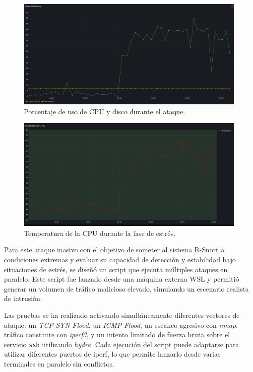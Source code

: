 \documentclass[11pt,a4paper,twoside]{report}
\begin{document}
\begin{figure}[H]
	\centering
	\includegraphics[width=\textwidth]{benchmark/5.png}
	\caption{Porcentaje de uso de CPU y disco durante el ataque.}
	\label{fig:bench-uso-cpu-disco}
\end{figure}

\begin{figure}[H]
	\centering
	\includegraphics[width=\textwidth]{benchmark/4.png}
	\caption{Temperatura de la CPU durante la fase de estrés.}
	\label{fig:bench-temp-cpu}
\end{figure}

Para este ataque masivo con el objetivo de someter al sistema R-Snort a condiciones extremas y evaluar su capacidad de detección y estabilidad bajo situaciones de estrés, se diseñó un script que ejecuta múltiples ataques en paralelo. Este script fue lanzado desde una máquina externa WSL y permitió generar un volumen de tráfico malicioso elevado, simulando un escenario realista de intrusión.\newline

Las pruebas se ha realizado activando simultáneamente diferentes vectores de ataque: un \textit{TCP SYN Flood}, un \textit{ICMP Flood}, un escaneo agresivo con \textit{nmap}, tráfico constante con \textit{iperf3}, y un intento limitado de fuerza bruta sobre el servicio \texttt{ssh} utilizando \textit{hydra}. Cada ejecución del script puede adaptarse para utilizar diferentes puertos de iperf, lo que permite lanzarlo desde varias terminales en paralelo sin conflictos.\newline
\end{document}
